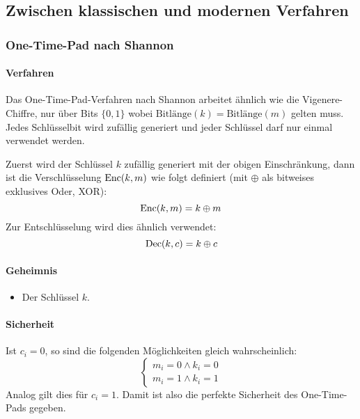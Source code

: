         \subsection{Zwischen klassischen und modernen Verfahren}
            \subsubsection{One-Time-Pad nach Shannon}
                \paragraph{Verfahren}
                    Das One-Time-Pad-Verfahren nach Shannon arbeitet ähnlich wie die Vigenere-Chiffre, nur über Bits \( \{ 0, 1 \} \) wobei \( \textrm{Bitlänge}(k) = \textrm{Bitlänge}(m) \) gelten muss. Jedes Schlüsselbit wird zufällig generiert und jeder Schlüssel darf nur einmal verwendet werden.
                    
                    Zuerst wird der Schlüssel \( k \) zufällig generiert mit der obigen Einschränkung, dann ist die Verschlüsselung \( \operatorname{Enc}(k, m) \) wie folgt definiert (mit \(\oplus\) als bitweises exklusives Oder, XOR):
                    \begin{equation*}
	                    \operatorname{Enc}(k, m) = k \oplus m
                    \end{equation*}
                    Zur Entschlüsselung wird dies ähnlich verwendet:
                    \begin{equation*}
	                    \operatorname{Dec}(k, c) = k \oplus c
                    \end{equation*}
                
                \paragraph{Geheimnis}
                    \begin{itemize}
                    	\item Der Schlüssel \(k\).
                    \end{itemize}
                
                \paragraph{Sicherheit}
                    Ist \( c_i = 0 \), so sind die folgenden Möglichkeiten gleich wahrscheinlich:
                    \begin{equation*}
	                    \begin{cases*}
		                    m_i = 0 \land k_i = 0 \\
		                    m_i = 1 \land k_i = 1
	                    \end{cases*}
                    \end{equation*}
                    Analog gilt dies für \( c_i = 1 \). Damit ist also die perfekte Sicherheit des One-Time-Pads gegeben.
                
